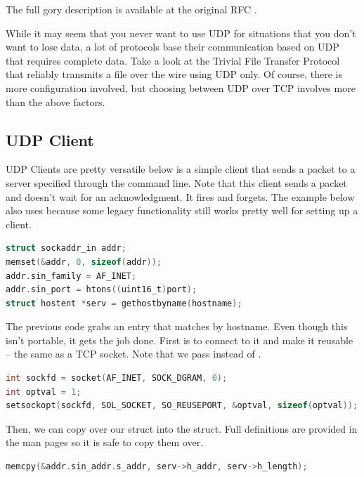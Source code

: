 The full gory description is available at the original RFC \cite{rfc768}.

While it may seem that you never want to use UDP for situations that you don't want to lose data, a lot of protocols base their communication based on UDP that requires complete data.
Take a look at the Trivial File Transfer Protocol that reliably transmits a file over the wire using UDP only.
Of course, there is more configuration involved, but choosing between UDP over TCP involves more than the above factors.

\subsection{UDP Client}

UDP Clients are pretty versatile below is a simple client that sends a packet to a server specified through the command line.
Note that this client sends a packet and doesn't wait for an acknowledgment.
It fires and forgets.
The example below also uses  because some legacy functionality still works pretty well for setting up a client.

\begin{lstlisting}[language=C]
struct sockaddr_in addr;
memset(&addr, 0, sizeof(addr));
addr.sin_family = AF_INET;
addr.sin_port = htons((uint16_t)port);
struct hostent *serv = gethostbyname(hostname);
\end{lstlisting}

The previous code grabs an entry  that matches by hostname.
Even though this isn't portable, it gets the job done.
First is to connect to it and make it reusable -- the same as a TCP socket.
Note that we pass  instead of .

\begin{lstlisting}[language=C]
int sockfd = socket(AF_INET, SOCK_DGRAM, 0);
int optval = 1;
setsockopt(sockfd, SOL_SOCKET, SO_REUSEPORT, &optval, sizeof(optval));
\end{lstlisting}

Then, we can copy over our  struct into the  struct.
Full definitions are provided in the man pages so it is safe to copy them over.

\begin{lstlisting}[language=C]
memcpy(&addr.sin_addr.s_addr, serv->h_addr, serv->h_length);
\end{lstlisting}

